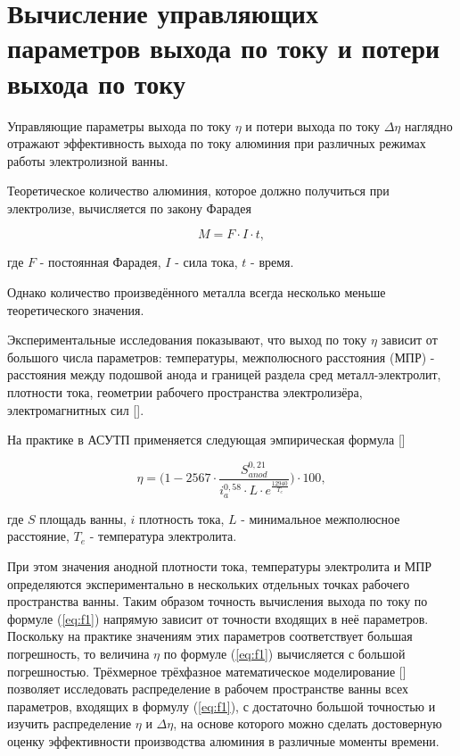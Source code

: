 \documentclass[pdflatex,sn-mathphys-gost]{pmi-jnl}
\begin{document}
\section{Вычисление управляющих параметров выхода по току и потери выхода по току}

Управляющие параметры выхода по току $\eta$ и потери выхода по току $\Delta \eta$ наглядно отражают эффективность выхода по току алюминия при различных режимах работы электролизной ванны.

Теоретическое количество алюминия, которое должно получиться при электролизе, вычисляется по закону Фарадея

\begin{equation}\label{eq:farad}
	M = F \cdot I \cdot t,
\end{equation}

где $F$ - постоянная Фарадея, $I$ - сила тока, $t$ - время.

Однако количество произведённого металла всегда несколько меньше теоретического значения.

Экспериментальные исследования показывают, что выход по току $\eta$ зависит от большого числа параметров: температуры, межполюсного расстояния (МПР) - расстояния между подошвой анода и границей раздела сред металл-электролит, плотности тока, геометрии рабочего пространства электролизёра, электромагнитных сил [\cite{litlink:belo}].

На практике в АСУТП применяется следующая эмпирическая формула [\cite{litlink:derkach2}]

\begin{equation}\label{eq:f1}
	\eta = \bigg(1-2567 \cdot \frac{S^{0,21}_{anod}}{i^{0,58}_{a}\cdot L \cdot e^{\frac{12940}{T_e}}}\bigg) \cdot 100,
\end{equation}

где $S$ площадь ванны, $i$ плотность тока, $L$ - минимальное межполюсное расстояние, $T_e$ - температура электролита.

При этом значения анодной плотности тока, температуры электролита и МПР определяются экспериментально в нескольких отдельных точках рабочего пространства ванны.
Таким образом точность вычисления выхода по току по формуле (\ref{eq:f1}) напрямую зависит от точности входящих в неё параметров. Поскольку на практике значениям этих параметров соответствует большая погрешность, то величина $\eta$ по формуле (\ref{eq:f1}) вычисляется с большой погрешностью. Трёхмерное трёхфазное математическое моделирование [\cite{litlink:kalmykov}] позволяет исследовать распределение в рабочем пространстве ванны всех параметров, входящих в формулу (\ref{eq:f1}), с достаточно большой точностью и изучить распределение $\eta$ и $\Delta\eta$, на основе которого можно сделать достоверную оценку эффективности производства алюминия в различные моменты времени.
\end{document}
